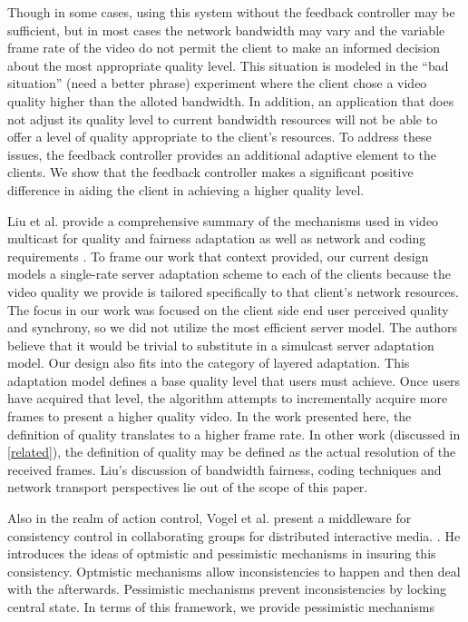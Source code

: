 \documentclass{sig-alternate}
\begin{document}
Though in some cases, using this system without the feedback
controller may be sufficient, but in most cases the network bandwidth
may vary and the variable frame rate of the video do not permit the
client to make an informed decision about the most appropriate quality
level.  This situation is modeled in the ``bad situation'' (need a
better phrase) experiment where the client chose a video quality
higher than the alloted bandwidth.  In addition, an application that
does not adjust its quality level to current bandwidth resources will
not be able to offer a level of quality appropriate to the client's
resources.  To address these issues, the feedback controller provides
an additional adaptive element to the clients.  We show that the
feedback controller makes a significant positive difference in aiding
the client in achieving a higher quality level.  

Liu et al. provide a comprehensive summary of the mechanisms used in
video multicast for quality and fairness adaptation as well as network
and coding requirements \cite{LIU}.  To frame our work that context
provided, our current design models a single-rate server adaptation
scheme to each of the clients because the video quality we provide is
tailored specifically to that client's network resources.  The focus
in our work was focused on the client side end user perceived quality
and synchrony, so we did not utilize the most efficient server model.
The authors believe that it would be trivial to substitute in a
simulcast server adaptation model.  Our design also fits into the
category of layered adaptation.  This adaptation model defines a base
quality level that users must achieve.  Once users have acquired that
level, the algorithm attempts to incrementally acquire more frames to
present a higher quality video.  In the work presented here, the
definition of quality translates to a higher frame rate.  In other
work (discussed in \ref{related}), the definition of quality may be
defined as the actual resolution of the received frames.  Liu's
discussion of bandwidth fairness, coding techniques and network
transport perspectives lie out of the scope of this paper.

Also in the realm of action control, Vogel et al. present a middleware
for consistency control in collaborating groups for distributed
interactive media.  \cite{VOGEL}.  He introduces the ideas of
optmistic and pessimistic mechanisms in insuring this consistency.
Optmistic mechanisms allow inconsistencies to happen and then deal
with the afterwards.  Pessimistic mechanisms prevent inconsistencies
by locking central state.  In terms of this framework, we provide
pessimistic mechanisms
\end{document}
